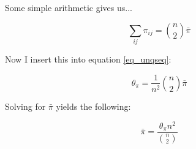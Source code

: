 Some simple arithmetic gives us...

\begin{equation} \label{eq_sumij}
    \sum_{ij} \pi_{ij} = \binom{n}{2} \bar{\pi}
\end{equation}

Now I insert this into equation \ref{eq_unqseq}:

\begin{equation} \label{eq_insbpi}
    \theta_\pi = \frac{1}{n^2} \binom{n}{2} \bar{\pi}
\end{equation}

Solving for $\bar{\pi}$ yields the following:

\begin{equation} \label{eq_solvebpi}
    \bar{\pi} = \frac{\theta_\pi n^2}{\binom{n}{2}}
\end{equation}


